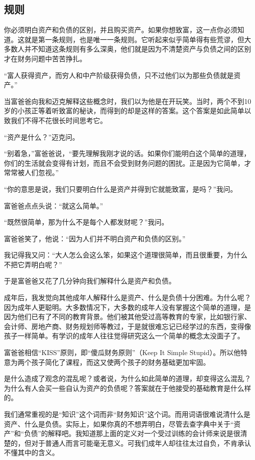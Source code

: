 \subsection*{规则}

你必须明白资产和负债的区别，并且购买资产。如果你想致富，这一点你必须知道。这就是第一条规则，也是唯一一条规则。它听起来似乎简单得有些荒谬，但大多数人并不知道这条规则有多么深奥，他们就是因为不清楚资产与负债之间的区别才在财务问题中苦苦挣扎。

“富人获得资产，而穷人和中产阶级获得负债，只不过他们以为那些负债就是资产。”

当富爸爸向我和迈克解释这些概念时，我们以为他是在开玩笑。当时，两个不到10岁的小孩正等着听致富的秘诀，而得到的却是这样的答案。这个答案是如此简单以致我们不得不花很长时间思考它。

“资产是什么？”迈克问。

“别着急，”富爸爸说，“要先理解我刚才说的话。如果你们能明白这个简单的道理，你们的生活就会变得有计划，而且不会受到财务问题的困扰。正是因为它简单，才常常被人们忽视。”

“你的意思是说，我们只要明白什么是资产并得到它就能致富，是吗？”我问。

富爸爸点点头说：“就这么简单。”

“既然很简单，那为什么不是每个人都发财呢？”我问。

富爸爸笑了，他说：“因为人们并不明白资产和负债的区别。”

我记得我又问：“大人怎么会这么笨，如果这个道理很简单，而且很重要，为什么不把它弄明白呢？”

于是富爸爸又花了几分钟向我们解释什么是资产和负债。

成年后，我发觉向其他成年人解释什么是资产、什么是负债十分困难。为什么呢？因为成年人更聪明。大多数情况下，大多数的成年人没有掌握这个简单的道理，是因为他们已有了不同的教育背景。他们被其他受过高等教育的专家，比如银行家、会计师、房地产商、财务规划师等教过，于是就很难忘记已经学过的东西，变得像孩子一样简单。有学识的成年人往往觉得研究这么一个简单的概念太没面子了。

富爸爸相信“KISS”原则，即“傻瓜财务原则”（Keep It Simple Stupid）。所以他特意为两个孩子简化了课程，而这又使两个孩子的财务基础更加牢固。

是什么造成了观念的混乱呢？或者说，为什么如此简单的道理，却变得这么混乱？为什么有人会买一些自认为资产的负债呢？答案就在于他接受的基础教育是什么样的。

我们通常重视的是“知识”这个词而非“财务知识”这个词。而用词语很难说清什么是资产、什么是负债。实际上，如果你真的不想弄明白，尽管去查字典中关于“资产”和“负债”的解释吧。我知道那上面的定义对一个受过训练的会计师来说是很清楚的，但对于普通人而言可能毫无意义。可我们成年人却往往太过自负，不肯承认不懂其中的含义。

